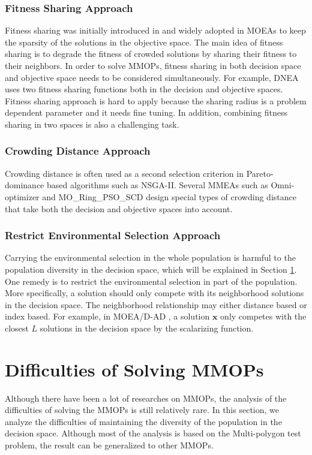 \documentclass[conference]{IEEEtran}
\begin{document}
\subsubsection{Fitness Sharing Approach}
Fitness sharing was initially introduced in \cite{Goldberg} and widely adopted in MOEAs to keep the sparsity of the solutions in the objective space. The main idea of fitness sharing is to degrade the fitness of crowded solutions by sharing their fitness to their neighbors. In order to solve MMOPs, fitness sharing in both decision space and objective space needs to be considered simultaneously. For example, DNEA\cite{DNEA} uses two fitness sharing functions both in the decision and objective spaces. Fitness sharing approach is hard to apply because the sharing radius is a problem dependent parameter and it needs fine tuning. In addition, combining fitness sharing in two spaces is also a challenging task.
\subsubsection{Crowding Distance Approach}
Crowding distance is often used as a second selection criterion in Pareto-dominance based algorithms such as NSGA-II\cite{NSGA-II}. Several MMEAs such as Omni-optimizer\cite{Omni-Optimizer} and MO\_Ring\_PSO\_SCD\cite{MO-Ring-PSO-SCD} design special types of crowding distance that take both the decision and objective spaces into account.
\subsubsection{Restrict Environmental Selection Approach}
Carrying the environmental selection in the whole population is harmful to the population diversity in the decision space, which will be explained in Section \ref{Difficulties Analysis}. One remedy is to restrict the environmental selection in part of the population. More specifically, a solution should only compete with its neighborhood solutions in the decision space. The neighborhood relationship may either distance based or index based. For example, in MOEA/D-AD \cite{MOEA/D-AD}, a solution $\boldsymbol{x}$ only competes with the closest $L$ solutions in the decision space by the scalarizing function.

\section{Difficulties of Solving MMOPs}
\label{Difficulties Analysis}
Although there have been a lot of researches on MMOPs, the analysis of the difficulties of solving the MMOPs is still relatively rare. In this section, we analyze the difficulties of maintaining the diversity of the population in the decision space. Although most of the analysis is based on the Multi-polygon test problem, the result can be generalized to other MMOPs. 
\end{document}
